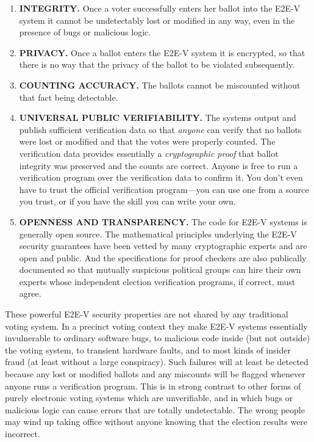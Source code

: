 \begin{enumerate}[label={\alph*})]
\item \textbf{INTEGRITY.} Once a voter successfully enters her ballot
  into the E2E-V system it cannot be undetectably lost or modified in
  any way, even in the presence of bugs or malicious logic.

\item \textbf{PRIVACY.} Once a ballot enters the E2E-V system it is
  encrypted, so that there is no way that the privacy of the ballot to
  be violated subsequently.

\item \textbf{COUNTING ACCURACY.} The ballots cannot be miscounted
  without that fact being detectable.

\item \textbf{UNIVERSAL PUBLIC VERIFIABILITY.} The systems output and
  publish sufficient verification data so that \emph{anyone} can
  verify that no ballots were lost or modified and that the votes were
  properly counted. The verification data provides essentially a
  \emph{cryptographic proof} that ballot integrity was preserved and
  the counts are correct. Anyone is free to run a verification program
  over the verification data to confirm it. You don't even have to
  trust the official verification program---you can use one from a
  source you trust, or if you have the skill you can write your own.

\item \textbf{OPENNESS AND TRANSPARENCY.} The code for E2E-V systems
  is generally open source. The mathematical principles underlying the
  E2E-V security guarantees have been vetted by many cryptographic
  experts and are open and public. And the specifications for proof
  checkers are also publically documented so that mutually suspicious
  political groups can hire their own experts whose independent
  election verification programs, if correct, must agree.
\end{enumerate}

These powerful E2E-V security properties are not shared by any
traditional voting system. In a precinct voting context they make
E2E-V systems essentially invulnerable to ordinary software bugs, to
malicious code inside (but not outside) the voting system, to
transient hardware faults, and to most kinds of insider fraud (at
least without a large conspiracy). Such failures will at least be
detected because any lost or modified ballots and any miscounts will
be flagged whenever anyone runs a verification program. This is in
strong contrast to other forms of purely electronic voting systems
which are unverifiable, and in which bugs or malicious logic can cause
errors that are totally undetectable.  The wrong people may wind up
taking office without anyone knowing that the election results were
incorrect.

